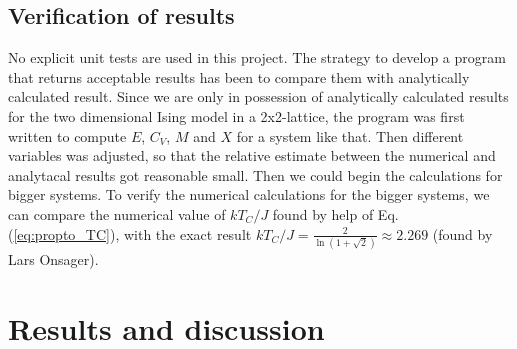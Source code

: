 \documentclass[12pt]{article}
\begin{document}
\begin{flushleft}
\subsection{Verification of results}
No explicit unit tests are used in this project. The strategy to develop a program that returns acceptable results has been to compare them with analytically calculated result. Since we are only in possession of analytically calculated results for the two dimensional Ising model in a 2x2-lattice, the program was first written to compute $E$, $C_V$, $M$ and $X$ for a system like that. Then different variables was adjusted, so that the relative estimate between the numerical and analytacal results got reasonable small. Then we could begin the calculations for bigger systems. To verify the numerical calculations for the bigger systems, we can compare the numerical value of $kT_C/J$ found by help of Eq. (\ref{eq:propto_TC}), with the exact result $kT_C/J = \frac{2}{\ln(1+\sqrt{2})} \approx 2.269$ (found by Lars Onsager).

\section{Results and discussion}

\end{flushleft}
\end{document}
